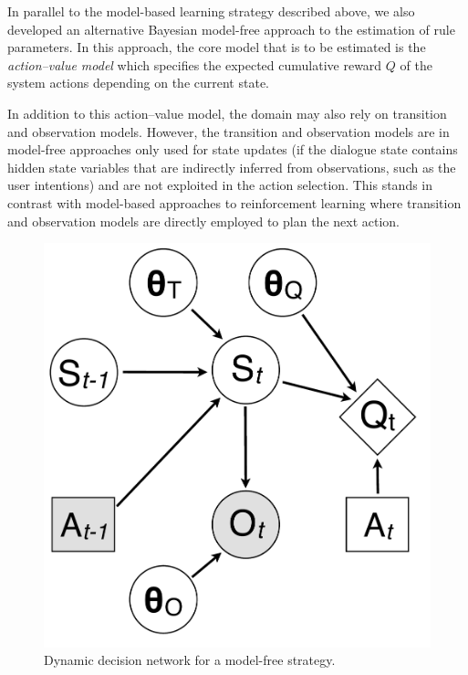 In parallel to the model-based learning strategy described above, we also developed an alternative Bayesian model-free approach to the estimation of rule parameters.  In this approach, the core model that is to be estimated is the \textit{action--value model} which specifies the expected cumulative reward $Q$ of the system actions depending on the current state. 

In addition to this action--value model, the domain may also rely on transition and observation models. However, the transition and observation models are in model-free approaches only used for state updates (if the dialogue state contains hidden state variables that are indirectly inferred from observations, such as the user intentions) and are not exploited in the action selection.  This stands in contrast with model-based approaches to reinforcement learning where transition and observation  models are directly employed to plan the next action.

\begin{figure}
\vspace{-2mm}
\centering
\includegraphics[scale=0.25]{imgs/modelfreediagram.pdf}
\vspace{-2mm}
\caption{Dynamic decision network for a model-free strategy.}
\label{fig:modelfreediagram}
\end{figure}

